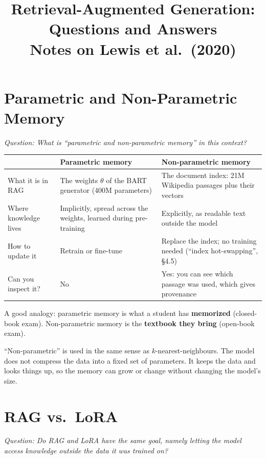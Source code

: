 \documentclass[11pt]{article}
\title{Retrieval-Augmented Generation: Questions and Answers\\[4pt]
  \large Notes on Lewis et al.\ (2020)}
\date{}
\newcommand{\question}[1]{\noindent\textit{Question: #1}\par\medskip}
\begin{document}
\maketitle


\section{Parametric and Non-Parametric Memory}\label{sec:memory}
\question{What is ``parametric and non-parametric memory'' in this context?}

\begin{center}
\begin{tabularx}{\textwidth}{@{}l Y Y@{}}
\toprule
 & \textbf{Parametric memory} & \textbf{Non-parametric memory} \\
\midrule
What it is in RAG & The weights $\theta$ of the BART generator (400M parameters) & The document index: 21M Wikipedia passages plus their vectors \\
\addlinespace
Where knowledge lives & Implicitly, spread across the weights, learned during pre-training & Explicitly, as readable text outside the model \\
\addlinespace
How to update it & Retrain or fine-tune & Replace the index; no training needed (``index hot-swapping'', \S4.5) \\
\addlinespace
Can you inspect it? & No & Yes: you can see which passage was used, which gives provenance \\
\bottomrule
\end{tabularx}
\end{center}

A good analogy: parametric memory is what a student has \textbf{memorized} (closed-book exam). Non-parametric memory is the \textbf{textbook they bring} (open-book exam).

``Non-parametric'' is used in the same sense as $k$-nearest-neighbours. The model does not compress the data into a fixed set of parameters. It keeps the data and looks things up, so the memory can grow or change without changing the model's size.

\section{RAG vs.\ LoRA}
\question{Do RAG and LoRA have the same goal, namely letting the model access knowledge outside the data it was trained on?}
\end{document}
